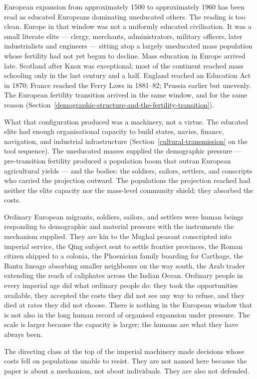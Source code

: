 \documentclass[12pt,letterpaper]{article}
\begin{document}
European expansion from approximately 1500 to approximately 1960 has
been read as educated Europeans dominating uneducated others. The
reading is too clean. Europe in that window was not a uniformly
educated civilisation. It was a small literate elite --- clergy,
merchants, administrators, military officers, later industrialists and
engineers --- sitting atop a largely uneducated mass population whose
fertility had not yet begun to decline. Mass education in Europe
arrived late. Scotland after Knox was exceptional; most of the
continent reached mass schooling only in the last century and a half.
England reached an Education Act in 1870; France reached the Ferry
Laws in 1881--82; Prussia earlier but unevenly. The European fertility
transition arrived in the same window, and for the same reason
(Section~\ref{demographic-structure-and-the-fertility-transition}).

What that configuration produced was a machinery, not a virtue. The
educated elite had enough organisational capacity to build states,
navies, finance, navigation, and industrial infrastructure
(Section~\ref{cultural-transmission} on the tool sequence). The
uneducated masses supplied the demographic pressure --- pre-transition
fertility produced a population boom that outran European agricultural
yields --- and the bodies: the soldiers, sailors, settlers, and
conscripts who carried the projection outward. The populations the
projection reached had neither the elite capacity nor the mass-level
community shield; they absorbed the costs.

Ordinary European migrants, soldiers, sailors, and settlers were human
beings responding to demographic and material pressure with the
instruments the mechanism supplied. They are kin to the Mughal peasant
conscripted into imperial service, the Qing subject sent to settle
frontier provinces, the Roman citizen shipped to a colonia, the
Phoenician family boarding for Carthage, the Bantu lineage absorbing
smaller neighbours on the way south, the Arab trader extending the
reach of caliphates across the Indian Ocean. Ordinary people in every
imperial age did what ordinary people do: they took the opportunities
available, they accepted the costs they did not see any way to refuse,
and they died at rates they did not choose. There is nothing in the
European window that is not also in the long human record of organised
expansion under pressure. The scale is larger because the capacity is
larger; the humans are what they have always been.

The directing class at the top of the imperial machinery made
decisions whose costs fell on populations unable to resist. They are
not named here because the paper is about a mechanism, not about
individuals. They are also not defended.
\end{document}
